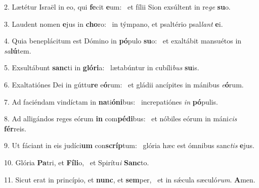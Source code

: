 2. Lætétur Israël in eo, qui \textbf{fe}cit \textbf{e}um: \ast\  et fílii Sion exsúltent in re\textit{ge} \textbf{su}o.\

3. Laudent nomen \textbf{e}jus in \textbf{cho}ro: \ast\  in týmpano, et psaltério psal\textit{lant} \textbf{e}i.\

4. Quia beneplácitum est Dómino in \textbf{pó}pulo \textbf{su}o: \ast\  et exaltábit mansuétos in \textit{sa}\textbf{lú}tem.\

5. Exsultábunt \textbf{sanc}ti in \textbf{gló}\textbf{ri}a: \ast\  lætabúntur in cubíli\textit{bus} \textbf{su}is.\

6. Exaltatiónes Dei in gúttu\textbf{re} e\textbf{ó}rum: \ast\  et gládii ancípites in mánibus \textit{e}\textbf{ó}rum.\

7. Ad faciéndam vindíctam in \textbf{na}ti\textbf{ó}\textbf{ni}bus: \ast\  increpatiónes \textit{in} \textbf{pó}pulis.\

8. Ad alligándos reges eórum \textbf{in} com\textbf{pé}\textbf{di}bus: \ast\  et nóbiles eórum in máni\textit{cis} \textbf{fér}reis.\

9. Ut fáciant in eis judíci\textbf{um} con\textbf{scríp}tum: \ast\  glória hæc est ómnibus sanc\textit{tis} \textbf{e}jus.\

10. Glória \textbf{Pa}tri, et \textbf{Fí}\textbf{li}o, \ast\  et Spirítu\textit{i} \textbf{Sanc}to.\

11. Sicut erat in princípio, et \textbf{nunc}, et \textbf{sem}per, \ast\  et in sǽcula sæculó\textit{rum}. \textbf{A}men.\

